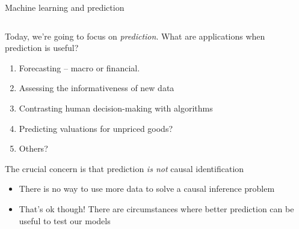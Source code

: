 \documentclass[notes,11pt, aspectratio=169]{beamer}
\newenvironment{wideitemize}{\itemize\addtolength{\itemsep}{10pt}}{\enditemize}
\begin{document}
\begin{frame}{Machine learning and prediction}
    \begin{columns}[onlytextwidth, T] %
      \begin{column}{.9\textwidth}
        \begin{wideitemize}
        \item Today, we're going to focus on \emph{prediction}. What
          are applications when prediction is useful?
          \pause
          \begin{enumerate}
          \item Forecasting -- macro or financial.
          \item Assessing the informativeness of new data
          \item Contrasting human decision-making with algorithms            
          \item Predicting valuations for unpriced goods?
          \item Others?
          \end{enumerate}
        \item The crucial concern is that prediction \emph{is not} causal identification
          \begin{itemize}
          \item There is no way to use more data to solve a causal inference problem
          \item That's ok though! There are circumstances where better
            prediction can be useful to test our models
          \end{itemize}
        \end{wideitemize}
      \end{column}%
      \hfill%
      \begin{column}{.5\textwidth}
      \end{column}%
    \end{columns}
\end{frame}
\end{document}
